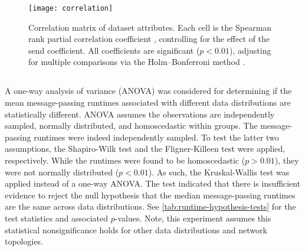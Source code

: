 \begin{figure}[htbp]
  \centering
  \texttt{[image: correlation]}
  \caption[Correlation matrix of  dataset attributes]{Correlation matrix of  dataset attributes. Each cell is the Spearman rank partial correlation coefficient \citep{Spearman1904}, controlling for the effect of the send coefficient. All coefficients are significant ($p < 0.01$), adjusting for multiple comparisons via the Holm–Bonferroni method \citep{Holm1979}.}
  \label{fig:correlation-matrix}
\end{figure}

\subsection{}\label{sec:runtime-baseline-experiment}

A one-way analysis of variance (ANOVA) was considered for determining if the mean message-passing runtimes associated with different data distributions are statistically different. ANOVA assumes the observations are independently sampled, normally distributed, and homoscedastic within groups. The message-passing runtimes were indeed independently sampled. To test the latter two assumptions, the Shapiro-Wilk test \citep{Shapiro1965} and the Fligner-Killeen test \citep{Fligner1976} were applied, respectively. While the runtimes were found to be homoscedastic ($p > \num{0.01}$), they were not normally distributed ($p < \num{0.01}$). As such, the Kruskal-Wallis test was applied instead of a one-way ANOVA. The test indicated that there is insufficient evidence to reject the null hypothesis that the median message-passing runtimes are the same across data distributions. See \cref{tab:runtime-hypothesis-tests} for the test statistics and associated $p$-values. Note, this experiment assumes this statistical nonsignificance holds for other data distributions and network topologies.

